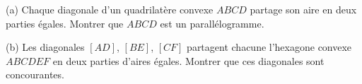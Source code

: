 (a) Chaque diagonale d'un quadrilatère convexe $ABCD$ partage son aire en deux parties égales. Montrer que $ABCD$ est un parallélogramme.

(b) Les diagonales $[AD]$, $[BE]$, $[CF]$ partagent chacune l'hexagone convexe $ABCDEF$ en deux parties d'aires égales. Montrer que ces diagonales sont concourantes.
